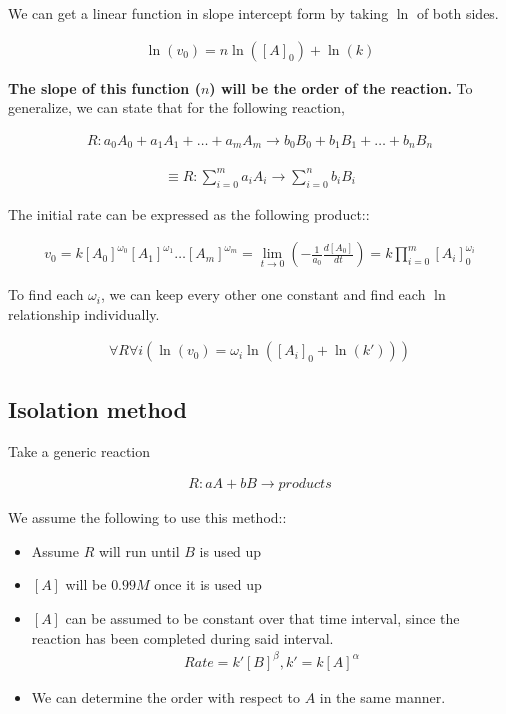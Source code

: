 \documentclass[12pt]{book}
\begin{document}
We can get a linear function in slope intercept form by taking $\ln$ of both sides.

\begin{align*}
    \ln(v_0)=n\ln([A]_0)+\ln(k)
\end{align*}

\textbf{The slope of this function ($n$) will be the order of the reaction.} To generalize, we can state that for the following reaction,

\begin{align*}
    R: a_0A_0+a_1A_1+\ldots+a_mA_m\rightarrow b_0B_0+b_1B_1+\ldots+b_nB_n
\end{align*}

\begin{align*}
    \equiv R: \sum_{i=0}^{m}a_iA_i\rightarrow\sum_{i=0}^{n}b_iB_i
\end{align*}

The initial rate can be expressed as the following product::

\begin{align*}
    v_0=k[A_0]^{\omega_0}[A_1]^{\omega_1}\ldots[A_m]^{\omega_m}=\lim_{t\rightarrow 0}\left(-\frac{1}{a_0}\frac{d[A_0]}{dt}\right)=k\prod_{i=0}^{m} [A_i]_0^{\omega_i}
\end{align*}

To find each $\omega_i$, we can keep every other one constant and find each $\ln$ relationship individually. 

\begin{align*}
    \forall R\forall i(\ln(v_0)=\omega_i\ln([A_i]_0+\ln(k')))
\end{align*}

\subsection*{Isolation method}

Take a generic reaction

\begin{align*}
    R:aA+bB\rightarrow products
\end{align*}

We assume the following to use this method::

\begin{itemize}
    \item Assume $R$ will run until $B$ is used up
    \item $[A]$ will be $0.99M$ once it is used up
    \item $[A]$ can be assumed to be constant over that time interval, since the reaction has been completed during said interval.
    \begin{align*}
        Rate=k'[B]^{\beta}, k'=k[A]^{\alpha}
    \end{align*}

    \item We can determine the order with respect to $A$ in the same manner.
\end{itemize}
\end{document}

